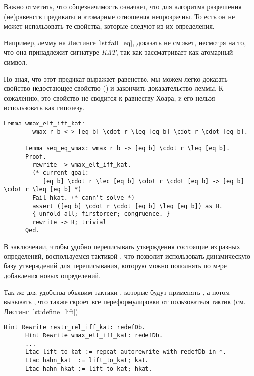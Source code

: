 \documentclass[times
              ,specification
              ,annotation
              ]{itmo-student-thesis}
\begin{document}
      Важно отметить, что общезначимость означает, что для алгоритма разрешения (не)равенств предикаты
      и атомарные отношения непрозрачны. То есть он не может использовать те свойства, которые следуют
      из их определения.

      Например, лемму  на \hyperref[lst:fail_eq]{Листинге \ref{lst:fail_eq}},
       доказать не сможет, несмотря на то, что она принадлежит сигнатуре \textit{KAT}, так
      как рассматривает  как атомарный символ.

      Но зная, что этот предикат  выражает равенство, мы можем легко доказать свойство
      недостающее свойство ()
      и закончить доказательство леммы. К сожалению, это свойство не сводится к равнеству Хоара, и его нельзя использовать как гипотезу.
      \begin{lstlisting}[float=!h, gobble=6,
        caption={Пример не возможного использования hkat из-за нехватки гипотезы о внутреннем устройстве
        предиката}, label={lst:fail_eq}]
      Lemma wmax_elt_iff_kat:
        wmax r b <-> [eq b] \cdot r \leq [eq b] \cdot r \cdot [eq b].

      Lemma seq_eq_wmax: wmax r b -> [eq b] \cdot r \leq [eq b].
      Proof.
        rewrite -> wmax_elt_iff_kat.
        (* current goal:
           [eq b] \cdot r \leq [eq b] \cdot r \cdot [eq b] -> [eq b] \cdot r \leq [eq b] *)
        Fail hkat. (* cann't solve *)
        assert ([eq b] \cdot r \cdot [eq b] \leq [eq b]) as H.
        { unfold_all; firstorder; congruence. }
        rewrite -> H; trivial
      Qed.
      \end{lstlisting}

      В заключении, чтобы удобно переписывать утверждения состоящие из разных определений, воспользуемся
      тактикой  \cite{coq_man}, что позволит использовать динамическую базу
      утверждений для переписывания, которую можно пополнять по мере добавления новых определений.
    
      Так же для удобства объявим тактики , которые будут применять ,
      а потом вызывать , что также скроет все переформулировки от
      пользователя тактик (см. \hyperref[lst:define_lift]{Листинг \ref{lst:define_lift}})

      \begin{lstlisting}[float=false, gobble=4,
        caption={Переопределение тактик \coqe{h(kat)}, для автоматической замены старых определений на новые}, label={lst:define_lift}]
      Hint Rewrite restr_rel_iff_kat: redefDb.
      Hint Rewrite wmax_elt_iff_kat: redefDb.
      ...
      Ltac lift_to_kat := repeat autorewrite with redefDb in *.
      Ltac hahn_kat  := lift_to_kat; kat.
      Ltac hahn_hkat := lift_to_kat; hkat.
      \end{lstlisting}
\end{document}
